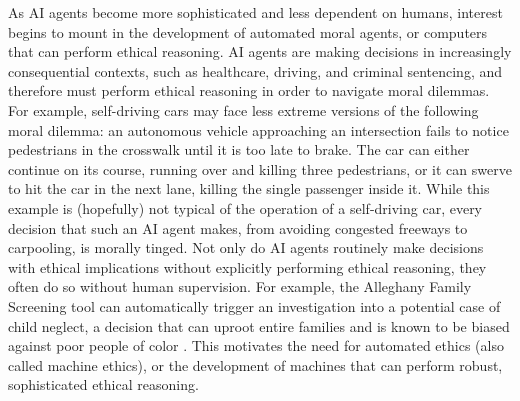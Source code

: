 %
\begin{isabellebody}%
%
%
\isadelimtheory
%
\endisadelimtheory
%
\isatagtheory
%
\endisatagtheory
{\isafoldtheory}%
%
\isadelimtheory
%
\endisadelimtheory
%
\isadelimdocument
%
\endisadelimdocument
%
\isatagdocument
%
\isamarkuptrue%
%
\endisatagdocument
{\isafolddocument}%
%
\isadelimdocument
%
\endisadelimdocument
%
\begin{isamarkuptext}%
As AI agents become more sophisticated and less dependent on humans, interest begins to mount
in the development of automated moral agents, or computers that can perform ethical reasoning. 
AI agents are making decisions in increasingly 
consequential contexts, such as healthcare, driving, and criminal sentencing, and therefore 
must perform ethical reasoning in order to navigate moral dilemmas. For example, self-driving
cars may face less extreme versions of the following moral dilemma: an autonomous vehicle approaching 
an intersection fails to notice pedestrians in the crosswalk until it is too late to brake. The car 
can either continue on its course, running over and killing three pedestrians, or it can swerve to 
hit the car in the next lane, killing the single passenger inside it. While this example is (hopefully) 
not typical of the operation of a self-driving car, every decision that such an AI agent makes, from 
avoiding congested freeways to carpooling, is morally tinged. Not only do AI agents routinely make decisions with 
ethical implications without explicitly performing ethical
reasoning, they often do so without human supervision. For example, the Alleghany Family Screening 
tool can automatically trigger an investigation into a potential case of child neglect, a decision that 
can uproot entire families and is known to be biased against poor people of color \citep{eubanks}. 
This motivates the need for automated ethics (also called machine ethics), 
or the development of machines that can perform robust, sophisticated ethical reasoning. 


\end{isamarkuptext}
\end{isabellebody}
